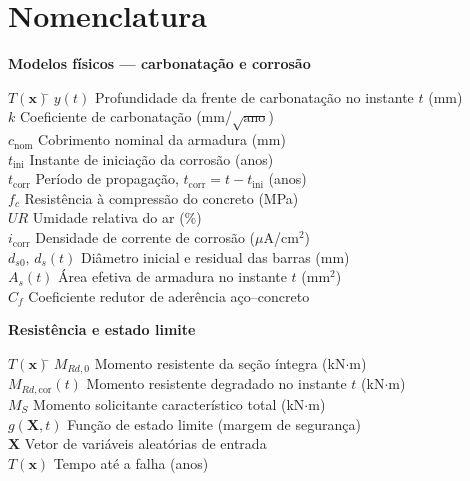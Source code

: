 \section*{Nomenclatura}


\noindent\textbf{Modelos f\'isicos --- carbonata\c{c}\~ao e corros\~ao}
\begin{tabbing}
$T(\mathbf{x})$\qquad\qquad \= \kill
$y(t)$        \> Profundidade da frente de carbonata\c{c}\~ao no instante $t$ (mm) \\
$k$           \> Coeficiente de carbonata\c{c}\~ao (mm/$\sqrt{\text{ano}}$) \\
$c_{\mathrm{nom}}$ \> Cobrimento nominal da armadura (mm) \\
$t_{\mathrm{ini}}$ \> Instante de inicia\c{c}\~ao da corros\~ao (anos) \\
$t_{\mathrm{corr}}$ \> Per\'iodo de propaga\c{c}\~ao, $t_{\mathrm{corr}} = t - t_{\mathrm{ini}}$ (anos) \\
$f_c$         \> Resist\^encia \`a compress\~ao do concreto (MPa) \\
$UR$          \> Umidade relativa do ar (\%) \\
$i_{\mathrm{corr}}$ \> Densidade de corrente de corros\~ao ($\mu$A/cm$^2$) \\
$d_{s0},\,d_s(t)$ \> Di\^ametro inicial e residual das barras (mm) \\
$A_s(t)$      \> \'Area efetiva de armadura no instante $t$ (mm$^2$) \\
$C_f$         \> Coeficiente redutor de ader\^encia a\c{c}o--concreto
\end{tabbing}

\noindent\textbf{Resist\^encia e estado limite}
\begin{tabbing}
$T(\mathbf{x})$\qquad\qquad \= \kill
$M_{Rd,0}$    \> Momento resistente da se\c{c}\~ao \'integra (kN$\cdot$m) \\
$M_{Rd,\mathrm{cor}}(t)$ \> Momento resistente degradado no instante $t$ (kN$\cdot$m) \\
$M_S$         \> Momento solicitante caracter\'istico total (kN$\cdot$m) \\
$g(\mathbf{X},t)$ \> Fun\c{c}\~ao de estado limite (margem de seguran\c{c}a) \\
$\mathbf{X}$  \> Vetor de vari\'aveis aleat\'orias de entrada \\
$T(\mathbf{x})$ \> Tempo at\'e a falha (anos)
\end{tabbing}

